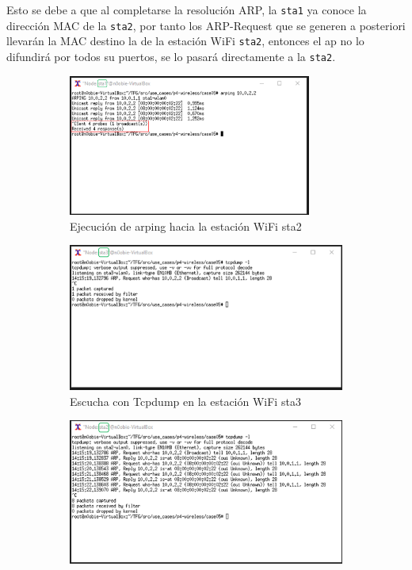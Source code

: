 Esto se debe a que al completarse la resolución ARP, la \texttt{sta1} ya conoce la dirección MAC de la \texttt{sta2}, por tanto los ARP-Request que se generen a posteriori llevarán la MAC destino la de la estación WiFi \texttt{sta2}, entonces el \gls{ap} no lo difundirá por todos su puertos, se lo pasará directamente a la \texttt{sta2}.

\newpage

\begin{figure}[h!]
    \centering
    \begin{subfigure}[b]{\textwidth}
    	\centering
        \includegraphics[width=8cm]{archivos/img/dev/p4-wifi/case05/demo_case05_1_edited.png}
        \caption{Ejecución de arping hacia la estación WiFi sta2}
        \label{fig:case05_p4_wifi_func_ping}
    \end{subfigure}
    \par\bigskip
    \begin{subfigure}[b]{\textwidth}
    	\centering
        \includegraphics[width=12cm]{archivos/img/dev/p4-wifi/case05/demo_case05_2_edited.png}
        \caption{Escucha con Tcpdump en la estación WiFi sta3}
        \label{fig:case05_p4_wifi_func_list1}
    \end{subfigure}
    \par\bigskip
    \begin{subfigure}[b]{\textwidth}
    	\centering
        \includegraphics[width=12cm]{archivos/img/dev/p4-wifi/case05/demo_case05_3_edited.png}

\end{subfigure}
\end{figure}
